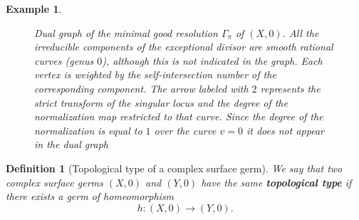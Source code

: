 \documentclass[reqno,dvipsnames,12pt]{amsart}
\newtheorem{defi}[thm]{Definition}
\newtheorem{exam}[thm]{Example}
\begin{document}
\begin{exam}
\begin{figure}[H]
  \caption{Dual graph of the minimal good resolution $\Gamma_\pi$ of $(X,0)$.  
All the irreducible components of the exceptional divisor are smooth rational curves (genus $0$), although this is not indicated in the graph. Each vertex is weighted by the self-intersection number of the corresponding component. The arrow labeled with $2$ represents the strict transform of the singular locus and the degree of the normalization map restricted to that curve. Since the degree of the normalization  is equal to $1$ over the curve $v=0$ it does not appear in the dual graph}


   \end{figure} 








\end{exam}


















\begin{defi}[Topological type of a complex surface germ]
We say that two complex surface germs $(X,0)$ and $(Y,0)$ have the same \textbf{topological type} if there exists a germ of  homeomorphism
\[
h : (X,0) \longrightarrow (Y,0).
\]
\end{defi}
\end{document}
